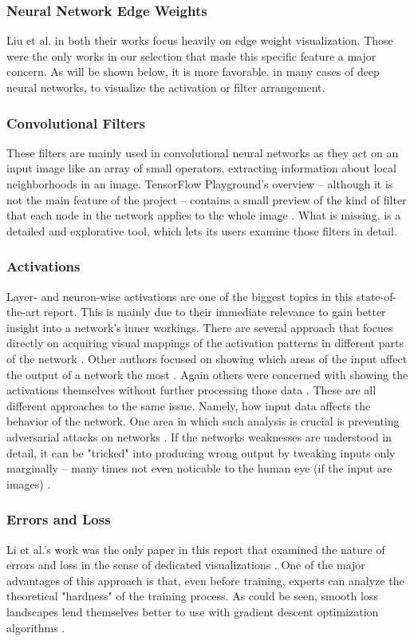 \documentclass{acmsiggraph}               %
\begin{document}
\subsubsection{Neural Network Edge Weights}
Liu et al. in both their works \cite{Liu2016,Liu2018} focus heavily on edge weight visualization. Those were the only works in our selection that made this specific feature a major concern. As will be shown below, it is more favorable, in many cases of deep neural networks, to visualize the activation or filter arrangement.
\subsubsection{Convolutional Filters}
These filters are mainly used in convolutional neural networks as they act on an input image like an array of small operators, extracting information about local neighborhoods in an image. TensorFlow Playground's overview -- although it is not the main feature of the project -- contains a small preview of the kind of filter that each node in the network applies to the whole image \cite{Smilkov2017}. What is missing, is a detailed and explorative tool, which lets its users examine those filters in detail.
\subsubsection{Activations}
Layer- and neuron-wise activations are one of the biggest topics in this state-of-the-art report. This is mainly due to their immediate relevance to gain better insight into a network's inner workings.
There are several approach that focues directly on acquiring visual mappings of the activation patterns in different parts of the network \cite{Yosinski2015,Nguyen2016}. Other authors focused on showing which areas of the input affect the output of a network the most \cite{Samek2017}. Again others were concerned with showing the activations themselves without further processing those data \cite{Liu2018}. These are all different approaches to the same issue. Namely, how input data affects the behavior of the network. One area in which such analysis is crucial is preventing adversarial attacks on networks \cite{Hohman2018}. If the networks weaknesses are understood in detail, it can be "tricked" into producing wrong output by tweaking inputs only marginally -- many times not even noticable to the human eye (if the input are images) \cite{Hohman2018}.
\subsubsection{Errors and Loss}
Li et al.'s work was the only paper in this report that examined the nature of errors and loss in the sense of dedicated visualizations \cite{Li2017}. One of the major advantages of this approach is that, even before training, experts can analyze the theoretical "hardness" of the training process. As could be seen, smooth loss landscapes lend themselves better to use with gradient descent optimization algorithms \cite{Li2017}.
\end{document}
